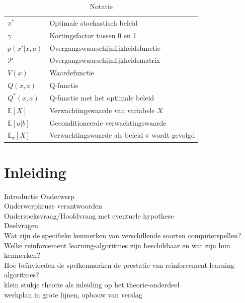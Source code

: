 \documentclass[a4paper,12pt]{report}
\begin{document}
\begin{table}[h]
\begin{tabular}{>{\raggedright}p{2.5cm} >{\raggedright\arraybackslash}p{10cm}}
        $\pi^*$                  & Optimale stochastisch beleid                      \\
        $\gamma$                 & Kortingsfactor tussen 0 en 1                      \\
        $p(x'|x, a)$             & Overgangswaarschijnlijkheidsfunctie               \\
        $\mathcal{P}$            & Overgangswaarschijnlijkheidsmatrix                \\
        $V(x)$                   & Waardefunctie                                     \\
        $Q(x, a)$                & Q-functie                                         \\
        $Q^*(x, a)$              & Q-functie met het optimale beleid                 \\
        $\mathbb{E}[X]$          & Verwachtingswaarde van variabele $X$              \\
        $\mathbb{E}[a|b]$        & Geconditioneerde verwachtingswaarde               \\
        $\mathbb{E}_{\pi}[X]$    & Verwachtingswaarde als beleid $\pi$ wordt gevolgd \\
    \end{tabular}
    \caption{Notatie}
\end{table}

\newpage

\tableofcontents
\newpage
{}  %
\chapter{Inleiding}
Introductie Onderwerp \\ Onderwerpkeuze verantwoorden \\
Onderzoeksvraag/Hoofdvraag met eventuele hypothese \\ Deelvragen \\ Wat zijn de
specifieke kenmerken van verschillende soorten computerspellen? \\ Welke
reinforcement learning-algoritmes zijn beschikbaar en wat zijn hun kenmerken?
\\ Hoe beïnvloeden de spelkenmerken de prestatie van reinforcement
learning-algoritmes? \\ klein stukje theorie als inleiding op het
theorie-onderdeel \\ werkplan in grote lijnen, opbouw van verslag \\
\end{document}
